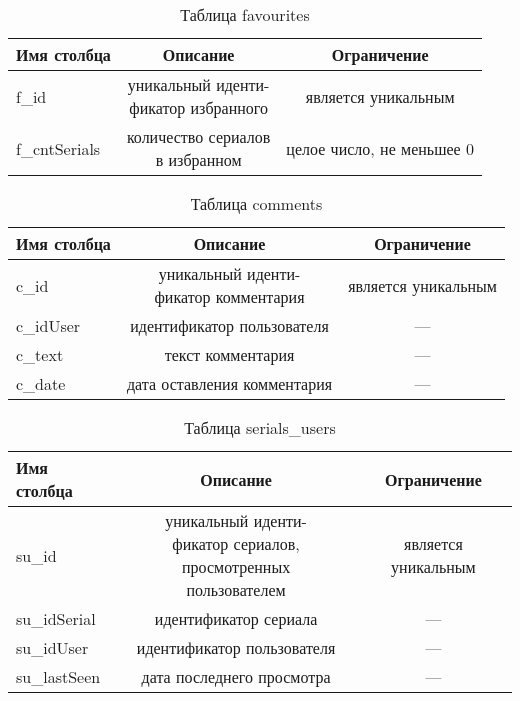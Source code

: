 \begin{table}[H]
    \begin{center}
        \caption{Таблица favourites}
        \label{tbl:favourites}
        \begin{tabular}{|l|c|c|}
            \hline
            Имя столбца & Описание & Ограничение \\ \hline
            f\_id & \makecell{уникальный иденти-\\фикатор избранного} & является уникальным\\ \hline
            f\_cntSerials & \makecell{количество сериалов\\в избранном} & целое число, не меньшее 0\\ \hline
        \end{tabular}
    \end{center}
\end{table}

\begin{table}[H]
    \begin{center}
        \caption{Таблица comments}
        \label{tbl:comments}
        \begin{tabular}{|l|c|c|}
            \hline
            Имя столбца & Описание & Ограничение \\ \hline
            c\_id & \makecell{уникальный иденти-\\фикатор комментария} & является уникальным\\ \hline
            c\_idUser & идентификатор пользователя & ---\\ \hline
            c\_text & текст комментария & ---\\ \hline
            c\_date & дата оставления комментария & ---\\ \hline
        \end{tabular}
    \end{center}
\end{table}

\begin{table}[H]
    \begin{center}
        \caption{Таблица serials\_users}
        \label{tbl:su}
        \begin{tabular}{|l|c|c|}
            \hline
            Имя столбца & Описание & Ограничение \\ \hline
            su\_id & \makecell{уникальный иденти-\\фикатор сериалов, просмотренных\\пользователем} & является уникальным\\ \hline
            su\_idSerial & идентификатор сериала & ---\\ \hline
            su\_idUser & идентификатор пользователя & ---\\ \hline
            su\_lastSeen & дата последнего просмотра & ---\\ \hline
        \end{tabular}
    \end{center}
\end{table}

